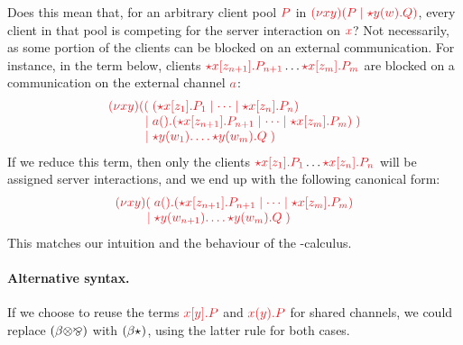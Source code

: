 \documentclass[envcountsame,UKenglish]{llncs}
\begin{document}
Does this mean that, for an arbitrary client pool $\tm{P}$ in $\tm{\piNew{x}{y}{(\piPar{P}{\ncSrv{y}{w}{Q}})}}$, every client in that pool is competing for the server interaction on $\tm{x}$? Not necessarily, as some portion of the clients can be blocked on an external communication. For instance, in the term below, clients $\tm{\ncCnt{x}{z_{n+1}}{P_{n+1}}} \dots \tm{\ncCnt{x}{z_m}{P_m}}$ are blocked on a communication on the external channel $\tm{a}$:
\[
  \arraycolsep=0pt
  \tm{
  \begin{array}{lrl}
    \piNew{x}{y}{}
    &  ((&\; \ncPool{\ncCnt{x}{z_1}{P_1}}{\dots\mid\ncCnt{x}{z_n}{P_n}}\\
    &\mid&\; \cpWait{a}{\ncPool{\ncCnt{x}{z_{n+1}}{P_{n+1}}}{\dots \mid \ncCnt{x}{z_m}{P_m}}}\;)\\
    &\mid&\; \ncSrv{y}{w_1}{\dots\ncSrv{y}{w_m}{Q}}\;)
  \end{array}}
\]
If we reduce this term, then only the clients $\tm{\ncCnt{x}{z_1}{P_1}} \dots \tm{\ncCnt{x}{z_n}{P_n}}$ will be assigned server interactions, and we end up with the following canonical form:
\[
  \arraycolsep=0pt
  \tm{
  \begin{array}{lrl}
    \piNew{x}{y}{}
    &   (&\; \cpWait{a}{\ncPool{\ncCnt{x}{z_{n+1}}{P_{n+1}}}{\dots\mid\ncCnt{x}{z_m}{P_m}}}\\
    &\mid&\; \ncSrv{y}{w_{n+1}}{\dots\ncSrv{y}{w_m}{Q}}\;)
  \end{array}}
\]
This matches our intuition and the behaviour of the \textpi-calculus.

\paragraph{Alternative syntax.}
If we choose to reuse the terms $\tm{\piSend{x}{y}{P}}$ and $\tm{\piRecv{x}{y}{P}}$ for shared channels, we could replace $(\beta{\ensuremath{\otimes}}{\mathbin{\bindnasrepma}})$ with $(\beta{\star}_{})$, using the latter rule for both cases.
\end{document}

